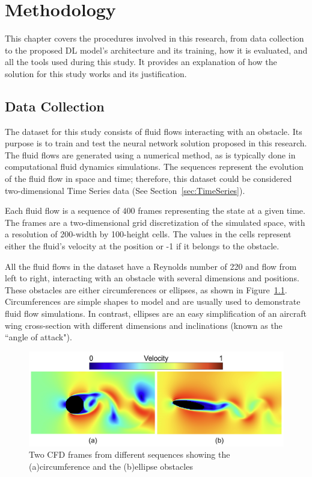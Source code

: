 
\chapter{Methodology}
\label{ch:Methodology}
This chapter covers the procedures involved in this research, from data collection to the proposed DL model's architecture and its training, how it is evaluated, and all the tools used during this study. It provides an explanation of how the solution for this study works and its justification.

\section{Data Collection}
\label{sec:DataCollection}
The dataset for this study consists of fluid flows interacting with an obstacle. Its purpose is to train and test the neural network solution proposed in this research. The fluid flows are generated using a numerical method, as is typically done in computational fluid dynamics simulations. The sequences represent the evolution of the fluid flow in space and time; therefore, this dataset could be considered two-dimensional Time Series data (See Section~\ref{sec:TimeSeries}).

Each fluid flow is a sequence of $400$ frames representing the state at a given time. The frames are a two-dimensional grid discretization of the simulated space, with a resolution of 200-width by 100-height cells. The values in the cells represent either the fluid's velocity at the position or -1 if it belongs to the obstacle. 

All the fluid flows in the dataset have a Reynolds number of 220 and flow from left to right, interacting with an obstacle with several dimensions and positions. These obstacles are either circumferences or ellipses, as shown in Figure~\ref{fig:cfd_obstacles}. Circumferences are simple shapes to model and are usually used to demonstrate fluid flow simulations. In contrast, ellipses are an easy simplification of an aircraft wing cross-section with different dimensions and inclinations (known as the ``angle of attack").

\begin{figure}[!h]
    \centering
    \includegraphics[width=0.9\linewidth]{images/cfd_obstacle_examples.png}
    \caption{Two CFD frames from different sequences showing the (a)circumference and the (b)ellipse obstacles}
    \label{fig:cfd_obstacles}
\end{figure}

